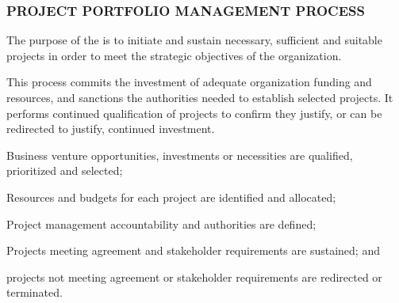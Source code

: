 		\newpage
		\subsubsection{PROJECT PORTFOLIO MANAGEMENT PROCESS\label{proc:project_portfolio_management_process}}

			\begin{adjustwidth}{2em}{0pt} 

				The purpose of the  is to initiate and sustain necessary, sufficient and suitable projects in order to meet the strategic objectives of the organization. 

				This process commits the investment of adequate organization funding and resources, and sanctions the authorities needed to establish selected projects. It performs continued qualification of projects to confirm they justify, or can be redirected to justify, continued investment.

			\end{adjustwidth}

			\begin{adjustwidth}{2em}{0pt} 

				\begin{compactitem}

					\item Business venture opportunities, investments or necessities are qualified, prioritized and selected;

					\item Resources and budgets for each project are identified and allocated;

					\item Project management accountability and authorities are defined;

					\item Projects meeting agreement and stakeholder requirements are sustained; and

					\item projects not meeting agreement or stakeholder requirements are redirected or terminated.

				\end{compactitem}

			\end{adjustwidth}

